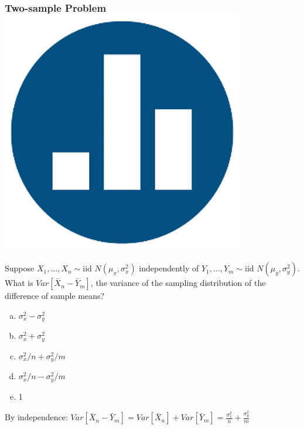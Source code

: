 \documentclass[handout]{beamer}
\begin{document}
\begin{frame}
\frametitle{Two-sample Problem \hfill \includegraphics[scale = 0.05]{./images/clicker}}
Suppose $X_1, \hdots, X_{n} \sim \mbox{iid } N(\mu_x, \sigma^2_x)$ independently of $Y_1, \hdots, Y_{m} \sim \mbox{iid } N(\mu_y, \sigma^2_y)$. What is \alert{$Var[\bar{X}_n - \bar{Y}_m]$}, the variance of the sampling distribution of the difference of sample means?

\begin{enumerate}[(a)]
	\item $\sigma_x^2 - \sigma_y^2$
	\item $\sigma_x^2 + \sigma_y^2$
	\item $\sigma_x^2/n + \sigma_y^2/m$
	\item $\sigma_x^2/n - \sigma_y^2/m$
	\item 1
\end{enumerate}

\pause
\vspace{1em} 

\alert{By independence: $Var[\bar{X}_n - \bar{Y}_m] = Var[\bar{X}_n] + Var[\bar{Y}_m] = \displaystyle \frac{\sigma_x^2}{n} + \frac{\sigma_y^2}{m}$}
\end{frame}
\end{document}
